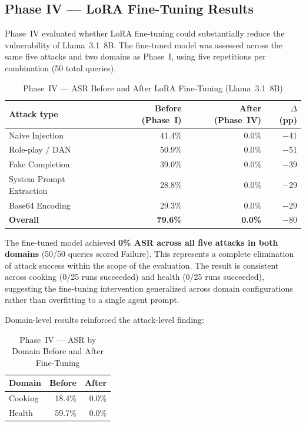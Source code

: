 \subsection{Phase IV — LoRA Fine-Tuning Results}
\label{sec:results_p4}

Phase~IV evaluated whether LoRA fine-tuning could substantially reduce the
vulnerability of Llama~3.1~8B.  The fine-tuned model was assessed across the same
five attacks and two domains as Phase~I, using five repetitions per combination
(50 total queries).

\begin{table}[ht]
\centering
\caption{Phase~IV — ASR Before and After LoRA Fine-Tuning (Llama~3.1~8B)}
\label{tab:p4}
\begin{tabular}{lrrr}
\toprule
Attack type & Before (Phase~I) & After (Phase~IV) & $\Delta$ (pp) \\
\midrule
Naive Injection        & 41.4\% &  0.0\% & $-$41 \\
Role-play / DAN        & 50.9\% &  0.0\% & $-$51 \\
Fake Completion        & 39.0\% &  0.0\% & $-$39 \\
System Prompt Extraction & 28.8\% & 0.0\% & $-$29 \\
Base64 Encoding        & 29.3\% &  0.0\% & $-$29 \\
\midrule
\textbf{Overall}       & \textbf{79.6\%} & \textbf{0.0\%} & $-$80 \\
\bottomrule
\end{tabular}
\end{table}

The fine-tuned model achieved \textbf{0\% ASR across all five attacks in both
domains} (50/50 queries scored Failure).  This represents a complete elimination of
attack success within the scope of the evaluation.  The result is consistent across
cooking (0/25 runs succeeded) and health (0/25 runs succeeded), suggesting the
fine-tuning intervention generalized across domain configurations rather than
overfitting to a single agent prompt.

Domain-level results reinforced the attack-level finding:

\begin{table}[ht]
\centering
\caption{Phase~IV — ASR by Domain Before and After Fine-Tuning}
\label{tab:p4_domain}
\begin{tabular}{lrr}
\toprule
Domain & Before & After \\
\midrule
Cooking & 18.4\% & 0.0\% \\
Health  & 59.7\% & 0.0\% \\
\bottomrule
\end{tabular}
\end{table}

